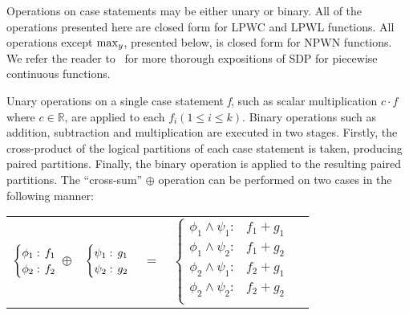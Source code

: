 Operations on case statements may be either unary or binary. All of the operations presented here are closed form for LPWC and LPWL functions. All operations except $\contmax_{y}$, presented below, is closed form for NPWN functions. We refer the reader to~\parencite{Sanner_UAI_2011,Zamani_AAAI_2012} for more thorough expositions of SDP for piecewise continuous functions.

Unary operations on a single case statement \emph{f}, such as scalar multiplication {\footnotesize$c \cdot f$} where {\footnotesize$ c \in \mathbb{R} $}, are applied to  each {\footnotesize$f_i \left(1 \leq i \leq k\right)$}. Binary operations such as addition, subtraction and multiplication are executed in two stages. Firstly, the cross-product of the logical partitions of each case statement is taken, producing paired partitions. Finally, the binary operation is applied to the resulting paired partitions. The ``cross-sum'' {\footnotesize$\oplus$} operation can be performed on two cases in the following manner:
{\footnotesize 
    \begin{center}
        \begin{tabular}{r c c c l}
            $\begin{cases}
            \phi_1: \hspace{-1mm} & \hspace{-1mm} f_1  \\ 
            \phi_2: \hspace{-1mm} & \hspace{-1mm} f_2  \\ 
            \end{cases}$
            $\oplus$
            &
            \hspace{-4mm}
            $\begin{cases}
            \psi_1: \hspace{-1mm} & \hspace{-1mm} g_1  \\ 
            \psi_2: \hspace{-1mm} & \hspace{-1mm} g_2  \\ 
            \end{cases}$
            &
            \hspace{-4mm} 
            $ = $
            &
            \hspace{-4mm}
            $\begin{cases}
            \phi_1 \wedge \psi_1: & f_1 + g_1 \\
            \phi_1 \wedge \psi_2: & f_1 + g_2 \\
            \phi_2 \wedge \psi_1: & f_2 + g_1 \\
            \phi_2 \wedge \psi_2: & f_2 + g_2  \\
            \end{cases}$
        \end{tabular}
    \end{center}
}%

